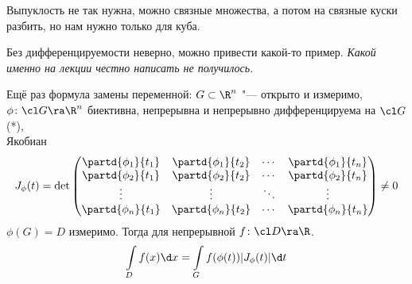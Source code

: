 \begin{Rem}
	Выпуклость не так нужна, можно связные множества, а потом на связные куски разбить, но нам нужно только для куба.
\end{Rem}

\begin{Rem}
	Без дифференцируемости неверно, можно привести какой-то пример.
	\textit{Какой именно на лекции честно написать не получилось.}
\end{Rem}

Ещё раз формула замены переменной:
$G \subset \R^n$ "--- открыто и измеримо, \\
$\phi\colon \cl G \ra \R^n$ биективна, непрерывна и непрерывно дифференцируема на $\cl G$ (*), \\
Якобиан
\[
	J_\phi(t) = \det
	\begin{pmatrix}
		\partd{\phi_1}{t_1} & \partd{\phi_1}{t_2} & \cdots & \partd{\phi_1}{t_n} \\
		\partd{\phi_2}{t_1} & \partd{\phi_2}{t_2} & \cdots & \partd{\phi_2}{t_n} \\
		\vdots              & \vdots              & \ddots & \vdots              \\
		\partd{\phi_n}{t_1} & \partd{\phi_n}{t_2} & \cdots & \partd{\phi_n}{t_n} \\
	\end{pmatrix} \ne 0
\]
$\phi(G) = D$ измеримо.
Тогда для непрерывной $f\colon \cl D \ra \R$. 
\[
	\int\limits_D f(x) \d x = \int\limits_G f(\phi(t)) |J_\phi(t)| \d t
\]

